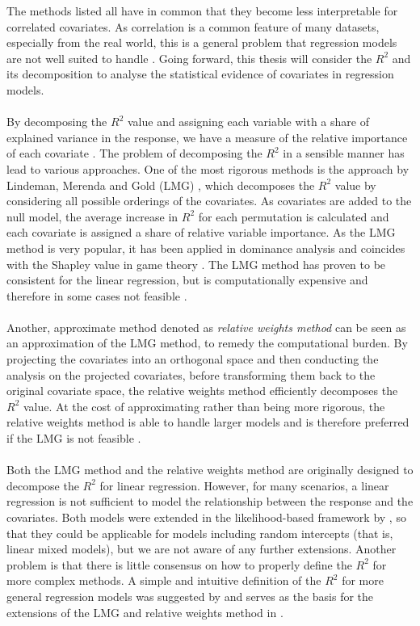 The methods listed all have in common that they become less interpretable for correlated covariates. As correlation is a common feature of many datasets, especially from the real world, this is a general problem that regression models are not well suited to handle \citep{Gromping_2015}. Going forward, this thesis will consider the $R^2$ and its decomposition to analyse the statistical evidence of covariates in regression models.
\\
\\
By decomposing the $R^2$ value and assigning each variable with a share of explained variance in the response, we have a measure of the relative importance of each covariate \citep{gromping_relaimpo}. The problem of decomposing the $R^2$ in a sensible manner has lead to various approaches. One of the most rigorous methods is the approach by Lindeman, Merenda and Gold (LMG) \citep{Lindeman1980}, which decomposes the $R^2$ value by considering all possible orderings of the covariates. As covariates are added to the null model, the average increase in $R^2$ for each permutation is calculated and each covariate is assigned a share of relative variable importance. As the LMG method is very popular, it has been applied in dominance analysis \citep{budescu1993dominance} and coincides with the Shapley value in game theory \citep{Shapley1953StochasticG,Lipovetsky_GameTheory}. The LMG method has proven to be consistent for the linear regression, but is computationally expensive and therefore in some cases not feasible \citep{gromping_relaimpo}. 
\\
\\
Another, approximate method denoted as \textit{relative weights method} \citep{johnson_minimization_trace, Fabbris1980, Genizi_relative_weights} can be seen as an approximation of the LMG method, to remedy the computational burden. By projecting the covariates into an orthogonal space and then conducting the analysis on the projected covariates, before transforming them back to the original covariate space, the relative weights method efficiently decomposes the $R^2$ value. At the cost of approximating rather than being more rigorous, the relative weights method is able to handle larger models and is therefore preferred if the LMG is not feasible \citep{gromping_relaimpo}.
\\
\\ 
Both the LMG method and the relative weights method are originally designed to decompose the $R^2$ for linear regression. However, for many scenarios, a linear regression is not sufficient to model the relationship between the response and the covariates. Both models were extended in the likelihood-based framework by \citet{matre}, so that they could be applicable for models including random intercepts (that is, linear mixed models), but we are not aware of any further extensions. Another problem is that there is little consensus on how to properly define the $R^2$ for more complex methods. A simple and intuitive definition of the $R^2$ for more general regression models was suggested by \citet{nakagawa2013general} and serves as the basis for the extensions of the LMG and relative weights method in \citet{matre}. 
